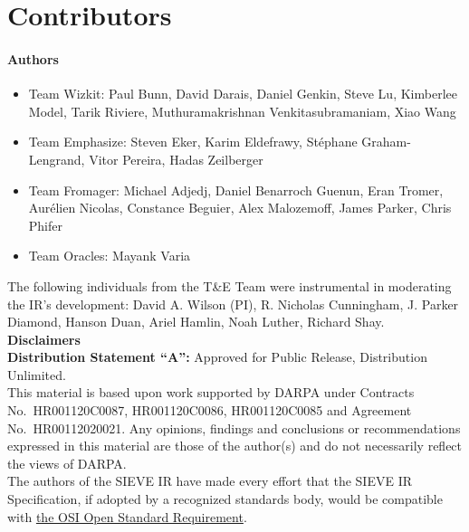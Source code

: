 
\section{Contributors}\label{contributors}

\paragraph{Authors}
\begin{itemize}
    \item Team Wizkit: Paul Bunn, David Darais, Daniel Genkin, Steve Lu, Kimberlee Model, Tarik Riviere, Muthuramakrishnan Venkitasubramaniam, Xiao Wang
    \item Team Emphasize:
    Steven Eker, Karim Eldefrawy, Stéphane Graham-Lengrand, Vitor Pereira, Hadas Zeilberger 
    \item Team Fromager: Michael Adjedj, Daniel Benarroch Guenun, Eran Tromer, Aurélien Nicolas, Constance Beguier, Alex Malozemoff, James Parker, Chris Phifer
    \item Team Oracles: Mayank Varia
\end{itemize}

The following individuals from the T\&E Team were instrumental in moderating the IR's development:
David A. Wilson (PI),
R. Nicholas Cunningham,
J. Parker Diamond,
Hanson Duan,
Ariel Hamlin,
Noah Luther,
Richard Shay.\\

\noindent\textbf{Disclaimers}
\\

\textbf{Distribution Statement ``A'':} Approved for Public Release, Distribution Unlimited. \\

This material is based upon work supported by DARPA under Contracts No.~HR001120C0087, HR001120C0086, HR001120C0085 and Agreement No.~HR00112020021.  Any opinions, findings and conclusions or recommendations expressed in this material are those of the author(s) and do not necessarily reflect the views of DARPA.\\

The authors of the SIEVE IR have made every effort that the SIEVE IR Specification, if adopted by a recognized standards body, would be compatible with \href{https://opensource.org/osr}{the OSI Open Standard Requirement}.

